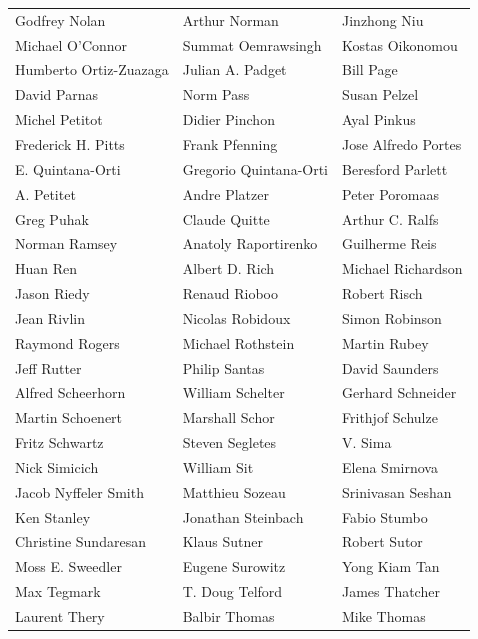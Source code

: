 \begin{tabular}{lll}
Godfrey Nolan          & Arthur Norman          & Jinzhong Niu\\
Michael O'Connor       & Summat Oemrawsingh     & Kostas Oikonomou\\
Humberto Ortiz-Zuazaga & Julian A. Padget       & Bill Page\\
David Parnas           & Norm Pass              & Susan Pelzel\\
Michel Petitot         & Didier Pinchon         & Ayal Pinkus\\
Frederick H. Pitts     & Frank Pfenning         & Jose Alfredo Portes\\
E. Quintana-Orti       & Gregorio Quintana-Orti & Beresford Parlett\\
A. Petitet             & Andre Platzer          & Peter Poromaas\\
Greg Puhak             & Claude Quitte          & Arthur C. Ralfs\\
Norman Ramsey          & Anatoly Raportirenko   & Guilherme Reis\\
Huan Ren               & Albert D. Rich         & Michael Richardson\\
Jason Riedy            & Renaud Rioboo          & Robert Risch\\
Jean Rivlin            & Nicolas Robidoux       & Simon Robinson\\
Raymond Rogers         & Michael Rothstein      & Martin Rubey\\
Jeff Rutter            & Philip Santas          & David Saunders\\
Alfred Scheerhorn      & William Schelter       & Gerhard Schneider\\
Martin Schoenert       & Marshall Schor         & Frithjof Schulze\\
Fritz Schwartz         & Steven Segletes        & V. Sima\\
Nick Simicich          & William Sit            & Elena Smirnova\\
Jacob Nyffeler Smith   & Matthieu Sozeau        & Srinivasan Seshan\\
Ken Stanley            & Jonathan Steinbach     & Fabio Stumbo\\
Christine Sundaresan   & Klaus Sutner           & Robert Sutor\\
Moss E. Sweedler       & Eugene Surowitz        & Yong Kiam Tan\\
Max Tegmark            & T. Doug Telford        & James Thatcher\\
Laurent Thery          & Balbir Thomas          & Mike Thomas\\

\end{tabular}
